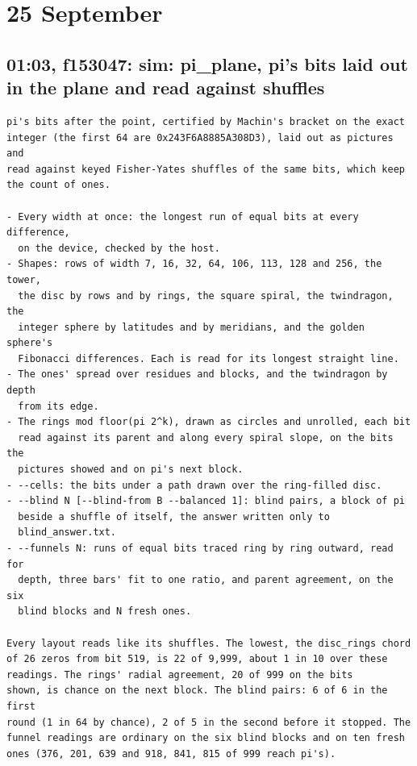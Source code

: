 \section{\texorpdfstring{25 September}{25 September}}

\subsection{\texorpdfstring{01:03, f153047: sim: pi\_\allowbreak{}plane, pi's bits laid out in the plane and read against shuffles}{01:03, f153047: sim: pi\_plane, pi's bits laid out in the plane and read against shuffles}}

\begin{Verbatim}
pi's bits after the point, certified by Machin's bracket on the exact
integer (the first 64 are 0x243F6A8885A308D3), laid out as pictures and
read against keyed Fisher-Yates shuffles of the same bits, which keep
the count of ones.

- Every width at once: the longest run of equal bits at every difference,
  on the device, checked by the host.
- Shapes: rows of width 7, 16, 32, 64, 106, 113, 128 and 256, the tower,
  the disc by rows and by rings, the square spiral, the twindragon, the
  integer sphere by latitudes and by meridians, and the golden sphere's
  Fibonacci differences. Each is read for its longest straight line.
- The ones' spread over residues and blocks, and the twindragon by depth
  from its edge.
- The rings mod floor(pi 2^k), drawn as circles and unrolled, each bit
  read against its parent and along every spiral slope, on the bits the
  pictures showed and on pi's next block.
- --cells: the bits under a path drawn over the ring-filled disc.
- --blind N [--blind-from B --balanced 1]: blind pairs, a block of pi
  beside a shuffle of itself, the answer written only to
  blind_answer.txt.
- --funnels N: runs of equal bits traced ring by ring outward, read for
  depth, three bars' fit to one ratio, and parent agreement, on the six
  blind blocks and N fresh ones.

Every layout reads like its shuffles. The lowest, the disc_rings chord
of 26 zeros from bit 519, is 22 of 9,999, about 1 in 10 over these
readings. The rings' radial agreement, 20 of 999 on the bits
shown, is chance on the next block. The blind pairs: 6 of 6 in the first
round (1 in 64 by chance), 2 of 5 in the second before it stopped. The
funnel readings are ordinary on the six blind blocks and on ten fresh
ones (376, 201, 639 and 918, 841, 815 of 999 reach pi's).
\end{Verbatim}

